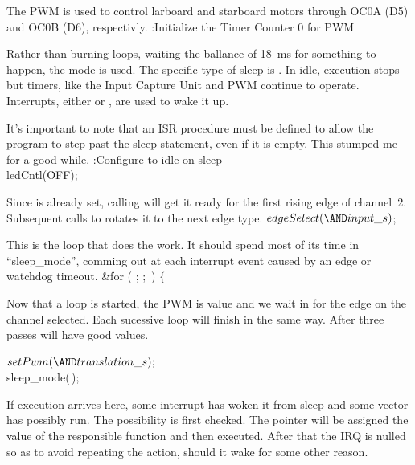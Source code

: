 
The PWM is used to control larboard and starboard motors through OC0A (D5) and
OC0B (D6), respectivly.
\Y\B{}:Initialize the Timer Counter 0 for PWM\X\par
\fi

Rather than burning loops, waiting the ballance of 18~ms for something to
happen, the  mode is used.
The specific type of sleep is .
In idle, execution stops but timers, like the Input Capture Unit and PWM
continue to operate.
Interrupts, either  or ,  are used to
wake it up.

It's important to note that an ISR procedure must be defined to allow the
program to step past the sleep statement, even if it is empty.
This stumped me for a good while.
\Y\B{}:Configure to idle on sleep\X\7
\\{ledCntl}(\.{OFF});\par
\fi

Since  is already set, calling  will get
it ready for
the first rising edge of channel~2.
Subsequent calls to  rotates it to the next edge type.
\Y\B$\\{edgeSelect}({\AND}\\{input\_s}){}$;\par
\fi

This is the loop that does the work.
It should spend most of its time in ``sleep\_mode'', comming out at each
interrupt event caused by an edge or watchdog timeout.
\Y\B\&{for} ( ;  ; \,) $\{{}$\Y\par
\fi

Now that a loop is started, the PWM is value and we wait in
 for the edge on the channel selected. Each sucessive loop will
finish
in the same way.
After three passes  will have good values.

\Y\B$\\{setPwm}({\AND}\\{translation\_s});{}$\6
\\{sleep\_mode}(\,);\par
\fi

If execution arrives here, some interrupt has woken it from sleep and some
vector has possibly run. The possibility is first checked.
The pointer  will be assigned the value of the responsible
function and then executed.
After that the IRQ is nulled so as to avoid repeating the action, should it
wake for some other reason.


